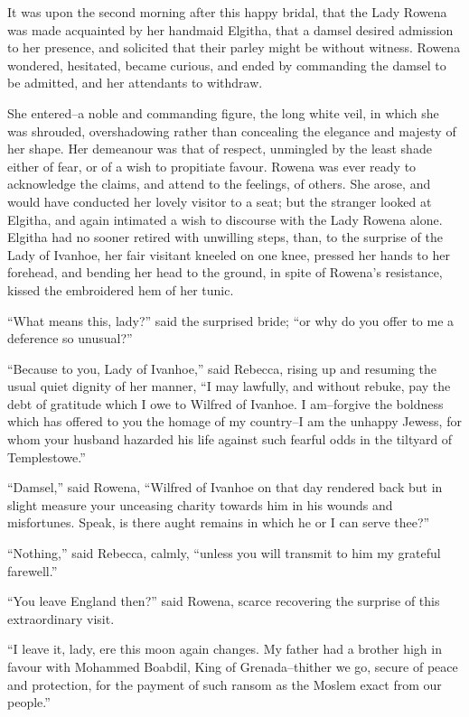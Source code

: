 It was upon the second morning after this happy bridal, that the Lady
Rowena was made acquainted by her handmaid Elgitha, that a damsel
desired admission to her presence, and solicited that their parley might
be without witness. Rowena wondered, hesitated, became curious, and
ended by commanding the damsel to be admitted, and her attendants to
withdraw.

She entered--a noble and commanding figure, the long white veil, in
which she was shrouded, overshadowing rather than concealing the
elegance and majesty of her shape. Her demeanour was that of respect,
unmingled by the least shade either of fear, or of a wish to propitiate
favour. Rowena was ever ready to acknowledge the claims, and attend to
the feelings, of others. She arose, and would have conducted her lovely
visitor to a seat; but the stranger looked at Elgitha, and again
intimated a wish to discourse with the Lady Rowena alone. Elgitha had no
sooner retired with unwilling steps, than, to the surprise of the Lady
of Ivanhoe, her fair visitant kneeled on one knee, pressed her hands to
her forehead, and bending her head to the ground, in spite of Rowena's
resistance, kissed the embroidered hem of her tunic.

``What means this, lady?'' said the surprised bride; ``or why do you
offer to me a deference so unusual?''

``Because to you, Lady of Ivanhoe,'' said Rebecca, rising up and
resuming the usual quiet dignity of her manner, ``I may lawfully, and
without rebuke, pay the debt of gratitude which I owe to Wilfred of
Ivanhoe. I am--forgive the boldness which has offered to you the homage
of my country--I am the unhappy Jewess, for whom your husband hazarded
his life against such fearful odds in the tiltyard of Templestowe.''

``Damsel,'' said Rowena, ``Wilfred of Ivanhoe on that day rendered back
but in slight measure your unceasing charity towards him in his wounds
and misfortunes. Speak, is there aught remains in which he or I can
serve thee?''

``Nothing,'' said Rebecca, calmly, ``unless you will transmit to him my
grateful farewell.''

``You leave England then?'' said Rowena, scarce recovering the surprise
of this extraordinary visit.

``I leave it, lady, ere this moon again changes. My father had a brother
high in favour with Mohammed Boabdil, King of Grenada--thither we go,
secure of peace and protection, for the payment of such ransom as the
Moslem exact from our people.''

